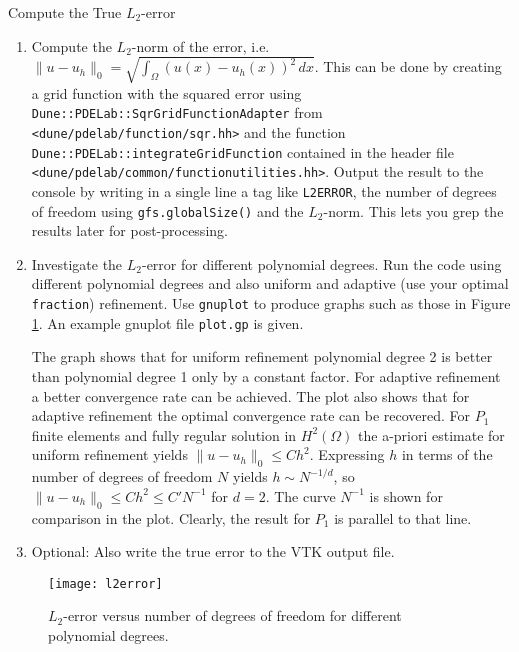 \documentclass[12pt,a4paper]{article}
\begin{document}
\begin{Exercise}{Compute the True $L_2$-error}
\begin{enumerate}
    \item Compute the $L_2$-norm of the error, i.e.
      $\|u-u_h\|_0 = \sqrt{\int_\Omega (u(x)-u_h(x))^2\,dx}$. This can
      be done by creating a grid function with the squared error using
      \lstinline{Dune::PDELab::SqrGridFunctionAdapter} from
      \lstinline{<dune/pdelab/function/sqr.hh>} and the function
      \lstinline{Dune::PDELab::integrateGridFunction} contained in the
      header file
      \lstinline{<dune/pdelab/common/functionutilities.hh>}.  Output
      the result to the console by writing in a single line a tag like
      \lstinline{L2ERROR}, the number of degrees of freedom using
      \lstinline{gfs.globalSize()} and the $L_2$-norm. This lets you
      grep the results later for post-processing.

    \item Investigate the $L_2$-error for different polynomial
      degrees. Run the code using different polynomial degrees and
      also uniform and adaptive (use your optimal
      \lstinline{fraction}) refinement. Use \lstinline{gnuplot} to
      produce graphs such as those in Figure \ref{Fig:L2}. An example
      gnuplot file \lstinline{plot.gp} is given.

      The graph shows that for uniform refinement polynomial degree 2
      is better than polynomial degree 1 only by a constant
      factor. For adaptive refinement a better convergence rate can be
      achieved. The plot also shows that for adaptive refinement the
      optimal convergence rate can be recovered. For $P_1$ finite
      elements and fully regular solution in $H^2(\Omega)$ the
      a-priori estimate for uniform refinement yields
      $\|u-u_h\|_0\leq C h^2$. Expressing $h$ in terms of the number
      of degrees of freedom $N$ yields $h\sim N^{-1/d}$, so
      $\|u-u_h\|_0\leq C h^2 \leq C' N^{-1}$ for $d=2$.  The curve
      $N^{-1}$ is shown for comparison in the plot. Clearly, the
      result for $P_1$ is parallel to that line.
    \item Optional: Also write the true error to the VTK output file.
    \end{enumerate}
\end{Exercise}


\begin{figure}
\begin{center}
\texttt{[image: l2error]}
\end{center}
\caption{$L_2$-error versus number of degrees of freedom for different polynomial degrees.}
\label{Fig:L2}
\end{figure}
\end{document}

